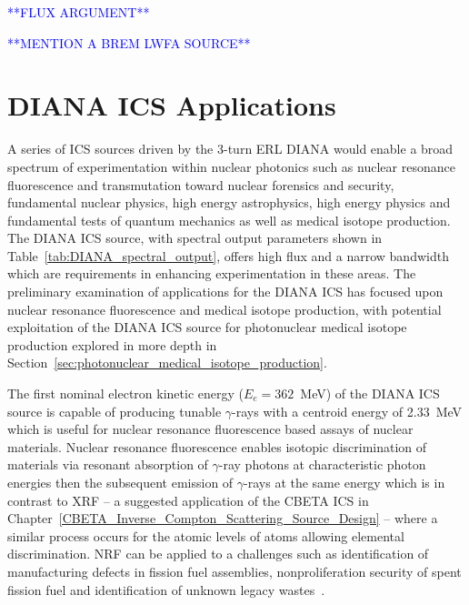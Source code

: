 \documentclass[../main.tex]{subfiles}
\begin{document}
\textcolor{blue}{**FLUX ARGUMENT**}

\textcolor{blue}{**MENTION A BREM LWFA SOURCE**}

\section{DIANA ICS Applications}

A series of ICS sources driven by the 3-turn ERL DIANA would enable a broad spectrum of experimentation within nuclear photonics \cite{nedorezov2017nuclear,budker2021expanding} such as nuclear resonance fluorescence and transmutation toward nuclear forensics and security, fundamental nuclear physics, high energy astrophysics, high energy physics and fundamental tests of quantum mechanics as well as medical isotope production. The DIANA ICS source, with spectral output parameters shown in Table~\ref{tab:DIANA_spectral_output}, offers high flux and a narrow bandwidth which are requirements in enhancing experimentation in these areas. The preliminary examination of applications for the DIANA ICS has focused upon nuclear resonance fluorescence and medical isotope production, with potential exploitation of the DIANA ICS source for photonuclear medical isotope production explored in more depth in Section~\ref{sec:photonuclear_medical_isotope_production}.  

The first nominal electron kinetic energy ($E_{e} = 362$~\si{\mega\electronvolt}) of the DIANA ICS source is capable of producing tunable $\gamma$-rays with a centroid energy of 2.33~\si{\mega\electronvolt} which is useful for nuclear resonance fluorescence based assays of nuclear materials. Nuclear resonance fluorescence enables isotopic discrimination of materials via resonant absorption of $\gamma$-ray photons at characteristic photon energies then the subsequent emission of $\gamma$-rays at the same energy which is in contrast to XRF -- a suggested application of the CBETA ICS in Chapter~\ref{CBETA_Inverse_Compton_Scattering_Source_Design} -- where a similar process occurs for the atomic levels of atoms allowing elemental discrimination. NRF can be applied to a challenges such as identification of manufacturing defects in fission fuel assemblies, nonproliferation security of spent fission fuel and identification of unknown legacy wastes~\cite{angal2018perle,angell2015demonstration,bolind2015states,geddes2017impact,kwan2011discrete}.
\end{document}

